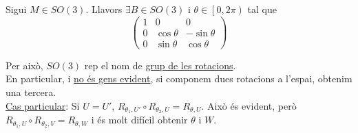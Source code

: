 \documentclass[../main.tex]{subfiles}
\begin{document}
\begin{itemize}
	    \begin{teorema}
	        Sigui $M\in SO(3)$. Llavors $\exists B \in SO(3)$ i $\theta \in \left[0, 2\pi\right)$ tal que
	        \begin{displaymath}
	            \begin{pmatrix}
	                1 & 0 & 0\\
	                0 & \cos{\theta} & -\sin{\theta}\\
	                0 & \sin{\theta} & \cos{\theta}
	            \end{pmatrix}
	        \end{displaymath}
	    \end{teorema}

	    Per això, $SO(3)$ rep el nom de \underline{grup de les rotacions}.\\
	    En particular, i \underline{no és gens evident}, si componem dues rotacions a l'espai, obtenim
	    una tercera.\\

	    \underline{Cas particular}: Si $U = U'$, $R_{\theta_1,U'}\circ R_{\theta_2,U} = R_{\theta,U}$.
	    Això és evident, però $R_{\theta_1,U}\circ R_{\theta_2,V} = R_{\theta,W}$ i és molt difícil
	    obtenir $\theta$ i $W$.
	\end{itemize}
\end{document}
